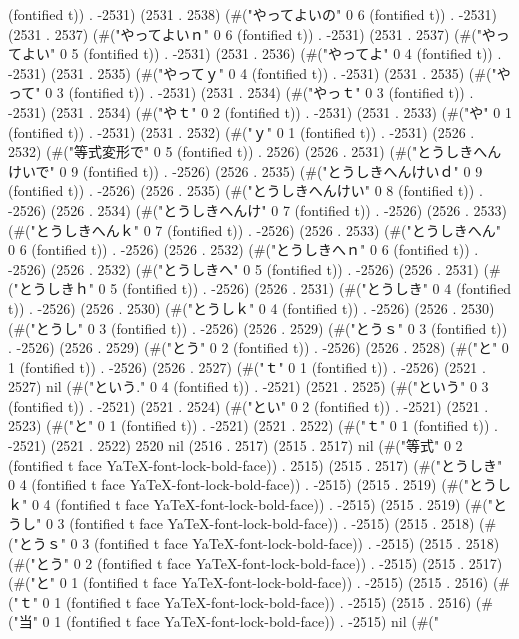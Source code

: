 (fontified t)) . -2531) (2531 . 2538) (#("やってよいの" 0 6 (fontified t)) . -2531) (2531 . 2537) (#("やってよいｎ" 0 6 (fontified t)) . -2531) (2531 . 2537) (#("やってよい" 0 5 (fontified t)) . -2531) (2531 . 2536) (#("やってよ" 0 4 (fontified t)) . -2531) (2531 . 2535) (#("やってｙ" 0 4 (fontified t)) . -2531) (2531 . 2535) (#("やって" 0 3 (fontified t)) . -2531) (2531 . 2534) (#("やっｔ" 0 3 (fontified t)) . -2531) (2531 . 2534) (#("やｔ" 0 2 (fontified t)) . -2531) (2531 . 2533) (#("や" 0 1 (fontified t)) . -2531) (2531 . 2532) (#("ｙ" 0 1 (fontified t)) . -2531) (2526 . 2532) (#("等式変形で" 0 5 (fontified t)) . 2526) (2526 . 2531) (#("とうしきへんけいで" 0 9 (fontified t)) . -2526) (2526 . 2535) (#("とうしきへんけいｄ" 0 9 (fontified t)) . -2526) (2526 . 2535) (#("とうしきへんけい" 0 8 (fontified t)) . -2526) (2526 . 2534) (#("とうしきへんけ" 0 7 (fontified t)) . -2526) (2526 . 2533) (#("とうしきへんｋ" 0 7 (fontified t)) . -2526) (2526 . 2533) (#("とうしきへん" 0 6 (fontified t)) . -2526) (2526 . 2532) (#("とうしきへｎ" 0 6 (fontified t)) . -2526) (2526 . 2532) (#("とうしきへ" 0 5 (fontified t)) . -2526) (2526 . 2531) (#("とうしきｈ" 0 5 (fontified t)) . -2526) (2526 . 2531) (#("とうしき" 0 4 (fontified t)) . -2526) (2526 . 2530) (#("とうしｋ" 0 4 (fontified t)) . -2526) (2526 . 2530) (#("とうし" 0 3 (fontified t)) . -2526) (2526 . 2529) (#("とうｓ" 0 3 (fontified t)) . -2526) (2526 . 2529) (#("とう" 0 2 (fontified t)) . -2526) (2526 . 2528) (#("と" 0 1 (fontified t)) . -2526) (2526 . 2527) (#("ｔ" 0 1 (fontified t)) . -2526) (2521 . 2527) nil (#("という." 0 4 (fontified t)) . -2521) (2521 . 2525) (#("という" 0 3 (fontified t)) . -2521) (2521 . 2524) (#("とい" 0 2 (fontified t)) . -2521) (2521 . 2523) (#("と" 0 1 (fontified t)) . -2521) (2521 . 2522) (#("ｔ" 0 1 (fontified t)) . -2521) (2521 . 2522) 2520 nil (2516 . 2517) (2515 . 2517) nil (#("等式" 0 2 (fontified t face YaTeX-font-lock-bold-face)) . 2515) (2515 . 2517) (#("とうしき" 0 4 (fontified t face YaTeX-font-lock-bold-face)) . -2515) (2515 . 2519) (#("とうしｋ" 0 4 (fontified t face YaTeX-font-lock-bold-face)) . -2515) (2515 . 2519) (#("とうし" 0 3 (fontified t face YaTeX-font-lock-bold-face)) . -2515) (2515 . 2518) (#("とうｓ" 0 3 (fontified t face YaTeX-font-lock-bold-face)) . -2515) (2515 . 2518) (#("とう" 0 2 (fontified t face YaTeX-font-lock-bold-face)) . -2515) (2515 . 2517) (#("と" 0 1 (fontified t face YaTeX-font-lock-bold-face)) . -2515) (2515 . 2516) (#("ｔ" 0 1 (fontified t face YaTeX-font-lock-bold-face)) . -2515) (2515 . 2516) (#("当" 0 1 (fontified t face YaTeX-font-lock-bold-face)) . -2515) nil (#("
